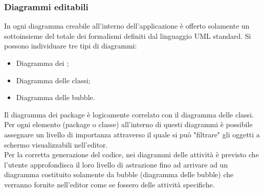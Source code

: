 \documentclass[../PianoDiQualifica.tex]{subfiles}
\begin{document}
			\subsubsection{Diagrammi editabili}
				In ogni diagramma creabile all'interno dell'applicazione è offerto solamente un
				sottoinsieme del totale dei formalismi definiti dal linguaggio UML standard.
				Si possono individuare tre tipi di diagrammi:
				\begin{itemize}
					\item Diagramma dei ;
					\item Diagramma delle classi;
					\item Diagramma delle bubble.
				\end{itemize}
				Il diagramma dei package è logicamente correlato con il diagramma delle classi. Per ogni
				elemento (package o classe) all'interno di questi diagrammi è possibile assegnare un
				livello di importanza attraverso il quale si può "filtrare" gli oggetti a schermo
				visualizzabili nell'editor.\\
				Per la corretta generazione del codice, nei diagrammi delle attività è previsto che
				l'utente approfondisca il loro livello di astrazione fino ad arrivare ad un diagramma
				costituito solamente da bubble (diagramma delle bubble) che verranno fornite nell'editor
				come se fossero delle attività specifiche.
\end{document}
